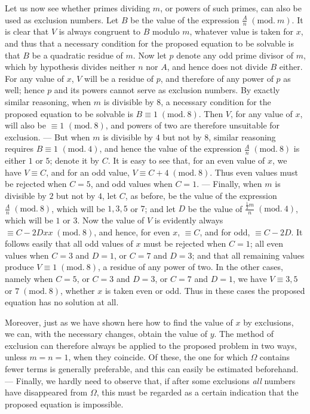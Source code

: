 Let us now see whether primes dividing \(m\), or powers of such primes, can also be used as exclusion numbers. Let \(B\) be the value of the expression \(\frac An\; (\mathrm{mod}.\ m)\). It is clear that \(V\) is always congruent to \(B\) modulo \(m\), whatever value is taken for \(x\), and thus that a necessary condition for the proposed equation to be solvable is that \(B\) be a quadratic residue of \(m\). Now let \(p\) denote any odd prime divisor of \(m\), which by hypothesis divides neither \(n\) nor \(A\), and hence does not divide \(B\) either. For any value of \(x\), \(V\) will be a residue of \(p\), and therefore of any power of \(p\) as well; hence \(p\) and its powers cannot serve as exclusion numbers. By exactly similar reasoning, when \(m\) is divisible by \(8\), a necessary condition for the proposed equation to be solvable is \(B\equiv1\; (\mathrm{mod}.\ 8)\). Then \(V\), for any value of \(x\), will also be \(\equiv1\) \((\mathrm{mod.}\ 8)\), and powers of two are therefore unsuitable for exclusion. — But
when \(m\) is divisible by \(4\) but not by \(8\), similar reasoning requires \(B\equiv1\) \((\mathrm{mod.}\ 4)\), and hence the value of the expression \(\frac An\; (\mathrm{mod}.\ 8)\) is either \(1\) or \(5\); denote it by \(C\). It is easy to see that, for an even value of \(x\), we have \(V\equiv C\), and for an odd value, \(V\equiv C+4\; (\mathrm{mod}.\ 8)\). Thus even values must be rejected when \(C=5\), and odd values when \(C=1\). — Finally, when \(m\) is divisible by \(2\) but not by \(4\), let \(C\), as before, be the value of the expression \(\frac An\; (\mathrm{mod}.\ 8)\), which will be \(1,\allowbreak 3,\allowbreak 5\) or \(7\); and let \(D\) be the value of \(\frac{\frac12m}{n}\; (\mathrm{mod}.\ 4)\), which will be \(1\) or \(3\). Now the value of \(V\) is evidently always \(\equiv C-2Dxx\; (\mathrm{mod}.\ 8)\), and hence, for even \(x\), \(\equiv C\), and for odd, \(\equiv C-2D\). It follows easily that all odd values of \(x\) must be rejected when \(C=1\); all even values when \(C=3\) and \(D=1\), or \(C=7\) and \(D=3\); and that all remaining values produce \(V\equiv1\; (\mathrm{mod}.\ 8)\), a residue of any power of two. In the other cases, namely when \(C=5\), or \(C=3\) and \(D=3\), or \(C=7\) and \(D=1\), we have \(V\equiv3,\allowbreak 5\) or \(7\; (\mathrm{mod}.\ 8)\), whether \(x\) is taken even or odd. Thus in these cases the proposed equation has no solution at all.

Moreover, just as we have shown here how to find the value of \(x\) by exclusions, we can, with the necessary changes, obtain the value of \(y\). The method of exclusion can therefore always be applied to the proposed problem in two ways, unless \(m=n=1\), when they coincide. Of these, the one for which \(\Omega\) contains fewer terms is generally preferable, and this can easily be estimated beforehand. — Finally, we hardly need to observe that, if after some exclusions \textit{all} numbers have disappeared from \(\Omega\), this must be regarded as a certain indication that the proposed equation is impossible.

